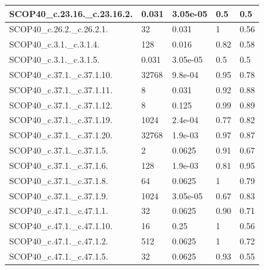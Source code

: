 \documentclass[11pt]{article}
\begin{document}
\begin{longtable}{|p{}|p{}|p{}|p{}|p{}|}
	SCOP40\_c.23.16.\_c.23.16.2.  & 0.031 & 3.05e-05 & 0.5    & 0.5   \\ \hline
	
	SCOP40\_c.26.2.\_c.26.2.1.    & 32    & 0.031    & 1      & 0.56  \\ \hline
	
	SCOP40\_c.3.1.\_c.3.1.4.      & 128   & 0.016    & 0.82   & 0.58  \\ \hline
	
	SCOP40\_c.3.1.\_c.3.1.5.      & 0.031 & 3.05e-05 & 0.5    & 0.5   \\ \hline
	
	SCOP40\_c.37.1.\_c.37.1.10.   & 32768 & 9.8e-04  & 0.95   & 0.78  \\ \hline
	
	SCOP40\_c.37.1.\_c.37.1.11.   & 8     & 0.031    & 0.92   & 0.88  \\ \hline
	
	SCOP40\_c.37.1.\_c.37.1.12.   & 8     & 0.125    & 0.99   & 0.89  \\ \hline
	
	SCOP40\_c.37.1.\_c.37.1.19.   & 1024  & 2.4e-04  & 0.77   & 0.82  \\ \hline
	
	SCOP40\_c.37.1.\_c.37.1.20.   & 32768 & 1.9e-03  & 0.97   & 0.87  \\ \hline
	
	SCOP40\_c.37.1.\_c.37.1.5.    & 2     & 0.0625   & 0.91   & 0.67  \\ \hline
	
	SCOP40\_c.37.1.\_c.37.1.6.    & 128   & 1.9e-03  & 0.81   & 0.95  \\ \hline
	
	SCOP40\_c.37.1.\_c.37.1.8.    & 64    & 0.0625   & 1      & 0.79  \\ \hline
	
	SCOP40\_c.37.1.\_c.37.1.9.    & 1024  & 3.05e-05 & 0.67   & 0.83  \\ \hline
	
	SCOP40\_c.47.1.\_c.47.1.1.    & 32    & 0.0625   & 0.90   & 0.71  \\ \hline
	
	SCOP40\_c.47.1.\_c.47.1.10.   & 16    & 0.25     & 1      & 0.56  \\ \hline
	
	SCOP40\_c.47.1.\_c.47.1.2.    & 512   & 0.0625   & 1      & 0.72  \\ \hline
	
	SCOP40\_c.47.1.\_c.47.1.5.    & 32    & 0.0625   & 0.93   & 0.55  \\ \hline
	

\end{longtable}
\end{document}
